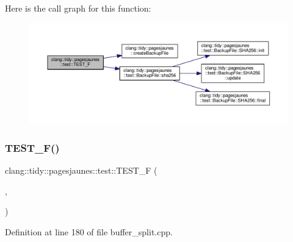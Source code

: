 Here is the call graph for this function\+:
\nopagebreak
\begin{figure}[H]
\begin{center}
\leavevmode
\includegraphics[width=350pt]{namespaceclang_1_1tidy_1_1pagesjaunes_1_1test_af47e8983ad0de8365930dbc09f15f6d0_cgraph}
\end{center}
\end{figure}
\mbox{\label{namespaceclang_1_1tidy_1_1pagesjaunes_1_1test_af3a20a024177569efd2b45f21e207966}} 
\subsubsection{\texorpdfstring{T\+E\+S\+T\+\_\+\+F()}{TEST\_F()}\hspace{0.1cm}{\footnotesize\ttfamily [41/57]}}
{\footnotesize\ttfamily clang\+::tidy\+::pagesjaunes\+::test\+::\+T\+E\+S\+T\+\_\+F (\begin{DoxyParamCaption}\item[{\hyperlink{classclang_1_1tidy_1_1pagesjaunes_1_1test_1_1_buffer_split_test}{Buffer\+Split\+Test}}]{,  }\item[{Big\+Buffers\+Start\+At0}]{ }\end{DoxyParamCaption})}



Definition at line 180 of file buffer\+\_\+split.\+cpp.

